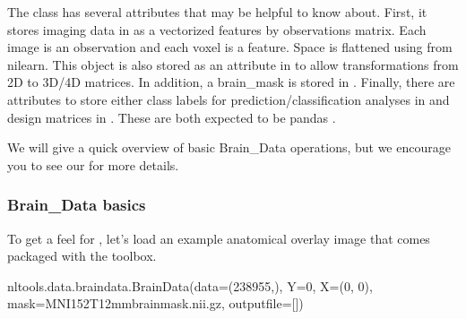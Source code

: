 \documentclass[letterpaper,10pt,english]{sphinxmanual}
\begin{document}
The  class has several attributes that may be helpful to know about. First, it stores imaging data in  as a vectorized features by observations matrix. Each image is an observation and each voxel is a feature. Space is flattened using  from nilearn. This object is also stored as an attribute in  to allow transformations from 2D to 3D/4D matrices. In addition, a brain\_mask is stored in . Finally, there are attributes to store either class labels for prediction/classification analyses in  and design matrices in . These are both expected to be pandas .

We will give a quick overview of basic Brain\_Data operations, but we encourage you to see our  for more details.


\subsubsection{Brain\_Data basics}
\label{\detokenize{content/Introduction_to_Neuroimaging_Data:brain-data-basics}}
To get a feel for , let’s load an example anatomical overlay image that comes packaged with the toolbox.

\begin{sphinxVerbatim}[commandchars=\\\{\}]
   
   

  
\end{sphinxVerbatim}

\begin{sphinxVerbatim}[commandchars=\\\{\}]
nltools.data.brain\PYGZus{}data.Brain\PYGZus{}Data(data=(238955,), Y=0, X=(0, 0), mask=MNI152\PYGZus{}T1\PYGZus{}2mm\PYGZus{}brain\PYGZus{}mask.nii.gz, output\PYGZus{}file=[])
\end{sphinxVerbatim}
\end{document}
